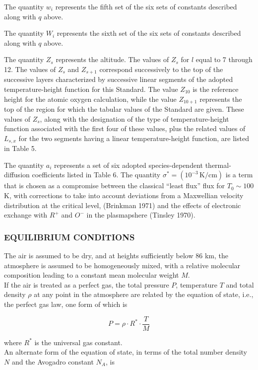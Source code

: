 \documentclass{article}
\begin{document}
The quantity $w_i$ represents the fifth set of the six sets of constants described along with $q$ above.

The quantity $W_i$ represents the sixth set of the six sets of constants described along with $q$ above.

The quantity $Z_s$ represents the altitude. The values of $Z_s$ for $l$ equal to 7 through 12. The values of $Z_s$ and $Z_{s+1}$ correspond successively to the top of the successive layers characterized by successive linear segments of the adopted temperature-height function for this Standard. The value $Z_{10}$ is the reference height for the atomic oxygen calculation, while the value $Z_{10+1}$ represents the top of the region for which the tabular values of the Standard are given. These values of $Z_s$, along with the designation of the type of temperature-height function associated with the first four of these values, plus the related values of $L_{s,x}$ for the two segments having a linear temperature-height function, are listed in Table 5.

The quantity $a_i$ represents a set of six adopted species-dependent thermal-diffusion coefficients listed in Table 6. The quantity $\sigma^* = (10^{-3}\, \mathrm{K/cm})$ is a term that is chosen as a compromise between the classical “least flux” flux for $T_{0} \sim 100$ K, with corrections to take into account deviations from a Maxwellian velocity distribution at the critical level, (Brinkman 1971) and the effects of electronic exchange with $R^+$ and $O^-$ in the plasmapshere (Tinsley 1970).

\subsubsection{EQUILIBRIUM CONDITIONS} 
The air is assumed to be dry, and at heights sufficiently below 86 km, the atmosphere is assumed to be homogeneously mixed, with a relative molecular composition leading to a constant mean molecular weight $M$. \\
If the air is treated as a perfect gas, the total pressure $P$, temperature $T$ and total density $\rho$ at any point in the atmosphere are related by the equation of state, i.e., the perfect gas law, one form of which is

\begin{equation}
    P = \rho \cdot R^* \cdot \frac{T}{M} \tag{1}
\end{equation}

where $R^*$ is the universal gas constant. \\
An alternate form of the equation of state, in terms of the total number density $N$ and the Avogadro constant $N_A$, is
\end{document}
